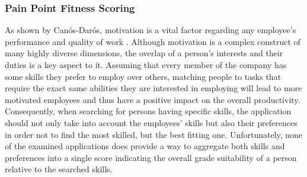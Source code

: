 \subsubsection{Pain Point Fitness Scoring}
As shown by Canós‐Darós, motivation is a vital factor regarding any employee's performance and quality of work \cite{CanosDaros2013}.
Although motivation is a complex construct of many highly diverse dimensions, the overlap of a person's interests and their duties is a key aspect to it.
Assuming that every member of the company has some skills they prefer to employ over others, matching people to tasks that require the exact same abilities they are interested in employing will lead to more motivated employees and thus have a positive impact on the overall productivity.
Consequently, when searching for persons having specific skills, the application should not only take into account the employees' skills but also their preferences in order not to find the most skilled, but the best fitting one. Unfortunately, none of the examined applications does provide a way to aggregate both skills and preferences into a single score indicating the overall grade suitability of a person relative to the searched skills.
